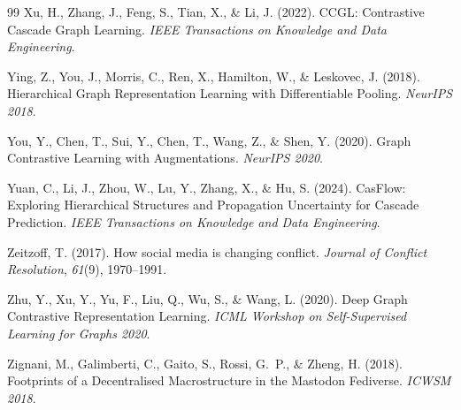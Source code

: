 \documentclass[12pt, a4paper]{article}
\begin{document}
\begin{thebibliography}{99}
Xu, H., Zhang, J., Feng, S., Tian, X., \& Li, J. (2022).
CCGL: Contrastive Cascade Graph Learning.
\textit{IEEE Transactions on Knowledge and Data Engineering}.

Ying, Z., You, J., Morris, C., Ren, X., Hamilton, W., \& Leskovec, J. (2018).
Hierarchical Graph Representation Learning with Differentiable Pooling.
\textit{NeurIPS 2018}.

You, Y., Chen, T., Sui, Y., Chen, T., Wang, Z., \& Shen, Y. (2020).
Graph Contrastive Learning with Augmentations.
\textit{NeurIPS 2020}.

Yuan, C., Li, J., Zhou, W., Lu, Y., Zhang, X., \& Hu, S. (2024).
CasFlow: Exploring Hierarchical Structures and Propagation Uncertainty for Cascade Prediction.
\textit{IEEE Transactions on Knowledge and Data Engineering}.

Zeitzoff, T. (2017).
How social media is changing conflict.
\textit{Journal of Conflict Resolution}, \textit{61}(9), 1970--1991.

Zhu, Y., Xu, Y., Yu, F., Liu, Q., Wu, S., \& Wang, L. (2020).
Deep Graph Contrastive Representation Learning.
\textit{ICML Workshop on Self-Supervised Learning for Graphs 2020}.

Zignani, M., Galimberti, C., Gaito, S., Rossi, G.\ P., \& Zheng, H. (2018).
Footprints of a Decentralised Macrostructure in the Mastodon Fediverse.
\textit{ICWSM 2018}.

\end{thebibliography}
\end{document}
